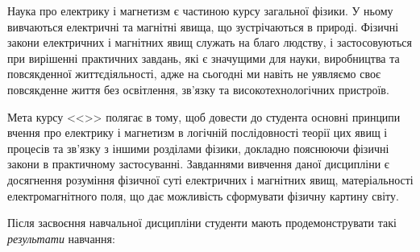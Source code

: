 \documentclass{Syllabus}
\begin{document}
Наука про електрику і магнетизм є частиною курсу загальної фізики. У ньому вивчаються електричні та магнітні явища, що зустрічаються в природі. Фізичні закони електричних і магнітних явищ служать на благо людству, і застосовуються при вирішенні практичних завдань, які є значущими для науки, виробництва та повсякденної життєдіяльності, адже на сьогодні ми навіть не уявляємо своє повсякденне життя без освітлення, зв'язку та високотехнологічних пристроїв.

Мета курсу <<\discipline>> полягає в тому, щоб довести до студента основні принципи вчення про електрику і магнетизм в логічній послідовності теорії цих явищ і процесів та зв'язку з іншими розділами фізики, докладно пояснюючи фізичні закони в практичному застосуванні. Завданнями вивчення даної дисципліни є досягнення розуміння фізичної суті електричних і магнітних явищ, матеріальності електромагнітного поля, що дає можливість сформувати фізичну картину світу.


Після засвоєння навчальної дисципліни студенти мають продемонструвати такі \emph{результати} навчання:
\end{document}
